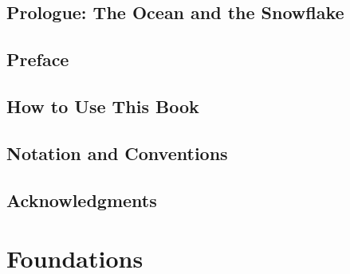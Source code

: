 \documentclass[11pt,letterpaper,openany]{book}
\begin{document}
\frontmatter







\chapter*{Prologue: The Ocean and the Snowflake}


\chapter*{Preface}


\chapter*{How to Use This Book}


\chapter*{Notation and Conventions}




\chapter*{Acknowledgments}


\tableofcontents
\listoffigures
\listoftables

\mainmatter

\part{Foundations}







\end{document}
